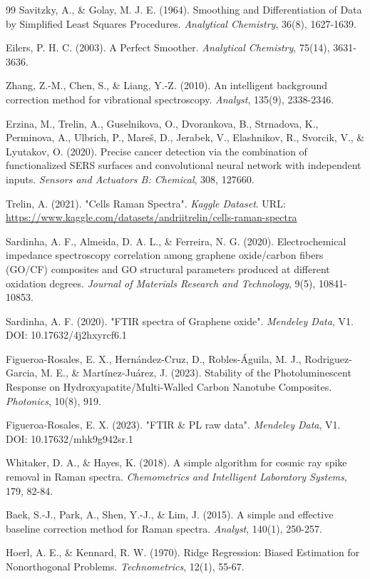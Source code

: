 \begin{thebibliography}{99}
Savitzky, A., \& Golay, M. J. E. (1964). Smoothing and Differentiation of Data by Simplified Least Squares Procedures. \textit{Analytical Chemistry}, 36(8), 1627-1639.

Eilers, P. H. C. (2003). A Perfect Smoother. \textit{Analytical Chemistry}, 75(14), 3631-3636.

Zhang, Z.-M., Chen, S., \& Liang, Y.-Z. (2010). An intelligent background correction method for vibrational spectroscopy. \textit{Analyst}, 135(9), 2338-2346.

Erzina, M., Trelin, A., Guselnikova, O., Dvorankova, B., Strnadova, K., Perminova, A., Ulbrich, P., Mareš, D., Jerabek, V., Elashnikov, R., Svorcik, V., \& Lyutakov, O. (2020). Precise cancer detection via the combination of functionalized SERS surfaces and convolutional neural network with independent inputs. \textit{Sensors and Actuators B: Chemical}, 308, 127660.

Trelin, A. (2021). "Cells Raman Spectra". \textit{Kaggle Dataset}. URL: \url{https://www.kaggle.com/datasets/andriitrelin/cells-raman-spectra}

Sardinha, A. F., Almeida, D. A. L., \& Ferreira, N. G. (2020). Electrochemical impedance spectroscopy correlation among graphene oxide/carbon fibers (GO/CF) composites and GO structural parameters produced at different oxidation degrees. \textit{Journal of Materials Research and Technology}, 9(5), 10841-10853.

Sardinha, A. F. (2020). "FTIR spectra of Graphene oxide". \textit{Mendeley Data}, V1. DOI: 10.17632/4j2hxyrcf6.1

Figueroa-Rosales, E. X., Hernández-Cruz, D., Robles-Águila, M. J., Rodriguez-Garcia, M. E., \& Martínez-Juárez, J. (2023). Stability of the Photoluminescent Response on Hydroxyapatite/Multi-Walled Carbon Nanotube Composites. \textit{Photonics}, 10(8), 919.

Figueroa-Rosales, E. X. (2023). "FTIR \& PL raw data". \textit{Mendeley Data}, V1. DOI: 10.17632/mhk9g942sr.1

Whitaker, D. A., \& Hayes, K. (2018). A simple algorithm for cosmic ray spike removal in Raman spectra. \textit{Chemometrics and Intelligent Laboratory Systems}, 179, 82-84.

Baek, S.-J., Park, A., Shen, Y.-J., \& Lim, J. (2015). A simple and effective baseline correction method for Raman spectra. \textit{Analyst}, 140(1), 250-257.

Hoerl, A. E., \& Kennard, R. W. (1970). Ridge Regression: Biased Estimation for Nonorthogonal Problems. \textit{Technometrics}, 12(1), 55-67.
\end{thebibliography}
